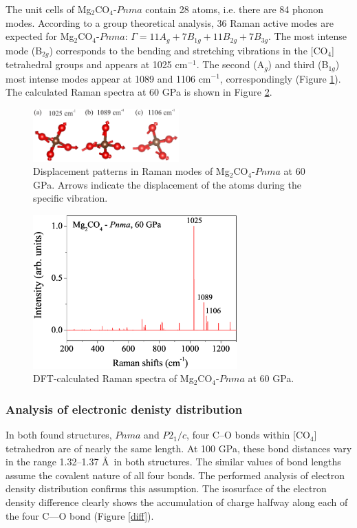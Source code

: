 \documentclass[a4paperm]{article}
\begin{document}
The unit cells of Mg$_2$CO$_4$-$Pnma$ contain 28 atoms, i.e. there are 84 phonon modes. 
According to a group theoretical analysis, 36 Raman active modes are expected for Mg$_2$CO$_4$-$Pnma$: $\Gamma = 11A_g + 7B_{1g} + 11B_{2g} + 7B_{3g}$. 
The most intense mode (B$_{2g}$) corresponds to the bending and stretching vibrations in the [CO$_4$] tetrahedral groups and appears at 1025 cm$^{-1}$. 
The second (A$_g$) and third (B$_{1g}$) most intense modes appear at 1089 and 1106 cm$^{-1}$, correspondingly (Figure \ref{displ}). The calculated Raman spectra at 60 GPa is shown in Figure \ref{raman}.

\begin{figure}[H]
	\includegraphics[width=0.5\textwidth]{dis_pat} \centering
	\caption{Displacement patterns in Raman modes of Mg$_2$CO$_4$-$Pnma$ at 60 GPa. Arrows indicate the displacement of the atoms during the specific vibration.} \label{displ}
\end{figure}

\begin{figure}[H]
	\includegraphics[width=0.7\textwidth]{raman_mg2co4} \centering
	\caption{DFT-calculated Raman spectra of Mg$_2$CO$_4$-$Pnma$ at 60 GPa.} \label{raman}
\end{figure}


\subsubsection*{Analysis of electronic denisty distribution}

In both found structures, $Pnma$ and $P2_1/c$, four C--O bonds within [CO$_4$] tetrahedron are of nearly the same length.
At 100 GPa, these bond distances vary in the range 1.32--1.37 \AA\ in both structures. 
The similar values of bond lengths assume the covalent nature of all four bonds.
The performed analysis of electron density distribution confirms this assumption.
The isosurface of the electron density difference clearly shows the accumulation of charge halfway along each of the four C—O bond (Figure \ref{diff}).
\end{document}
